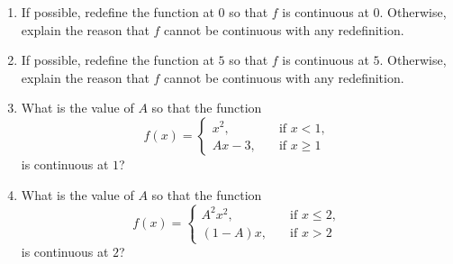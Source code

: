 \documentclass[11pt]{book}
\begin{document}
\begin{enumerate}[label=\arabic*.]
\begin{enumerate}
    \end{enumerate}
    \item If possible, redefine the function at $0$ so that $f$ is continuous at $0$. Otherwise, explain the reason that $f$ cannot be continuous with any redefinition.
    \begin{enumerate}
    \end{enumerate}
    \item If possible, redefine the function at $5$ so that $f$ is continuous at $5$. Otherwise, explain the reason that $f$ cannot be continuous with any redefinition.
    \begin{enumerate}
    \end{enumerate}
    \item What is the value of $A$ so that the function $$f(x)=\left\{\begin{array}{ll}
        x^2, \quad & \text{if $x<1$},\\
        Ax-3, \quad & \text{if $x\geq1$}
    \end{array}\right.$$ is continuous at $1$?
    \item What is the value of $A$ so that the function $$f(x)=\left\{\begin{array}{ll}
        A^2x^2, \quad & \text{if $x\leq2$},\\
        (1-A)x, \quad & \text{if $x>2$}
    \end{array}\right.$$ is continuous at $2$?

\end{enumerate}
\end{document}
